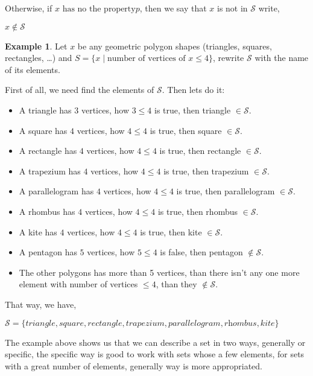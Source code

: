 \documentclass[11pt, a4paper]{amsart}
\numberwithin{equation}{section}
\theoremstyle{plain} %
\theoremstyle{definition}
\newtheorem{ex}{Example}[section]
\theoremstyle{remark}
\begin{document}
Otherwise, if $x \text{ has no the property} p$, then we say that $x$ is not in $\mathcal{S}$ write,
\begin{center}
    $x\notin\mathcal{S}$
\end{center}

\begin{ex}
Let $x$ be any geometric polygon shapes (triangles, squares, rectangles, \dots) and $S=\lbrace x \mid \text{number of vertices of }x \leq 4\rbrace$, rewrite $\mathcal{S}$ with the name of its elements.

First of all, we need find the elements of $\mathcal{S}$. Then lets do it:
\begin{itemize}
  \item A triangle has $3$ vertices, how $3\leq4$ is true, then triangle $\in \mathcal{S}$.
  \item A square has $4$ vertices, how $4\leq4$ is true, then square $\in \mathcal{S}$.
  \item A rectangle has $4$ vertices, how $4\leq4$ is true, then rectangle $\in \mathcal{S}$.
  \item A trapezium has $4$ vertices, how $4\leq4$ is true, then trapezium $\in \mathcal{S}$.
  \item A parallelogram has $4$ vertices, how $4\leq4$ is true, then parallelogram $\in \mathcal{S}$.
  \item A rhombus has $4$ vertices, how $4\leq4$ is true, then rhombus $\in \mathcal{S}$.
  \item A kite has $4$ vertices, how $4\leq4$ is true, then kite $\in \mathcal{S}$.
  \item A pentagon has $5$ vertices, how $5\leq4$ is false, then pentagon $\notin\mathcal{S}$.
  \item The other polygons has more than 5 vertices, than there isn't any one more element with number of vertices $\leq4$, than they $\notin\mathcal{S}$.
\end{itemize}

That way, we have,
\begin{center}
    $\mathcal{S}=\lbrace\textit{triangle}, \textit{square}, \textit{rectangle}, \textit{trapezium}, \textit{parallelogram}, \textit{rhombus}, \textit{kite}\rbrace$
\end{center}
\end{ex}
The example above shows us that we can describe a set in two ways, generally or specific, the specific way is good to work with sets whose a few elements, for sets with a great number of elements, generally way is more appropriated.
\end{document}
